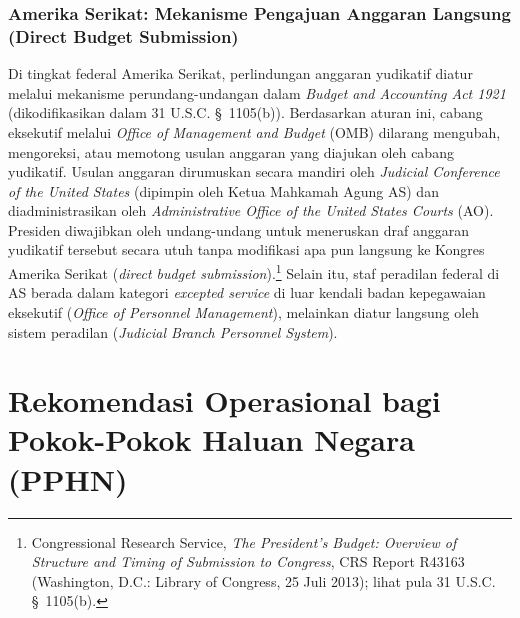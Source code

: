 \documentclass[12pt,a4paper,twocolumn]{article}
\begin{document}
\subsubsection{Amerika Serikat: Mekanisme Pengajuan Anggaran Langsung (Direct Budget Submission)}
Di tingkat federal Amerika Serikat, perlindungan anggaran yudikatif diatur melalui mekanisme perundang-undangan dalam \textit{Budget and Accounting Act 1921} (dikodifikasikan dalam 31 U.S.C. \S\ 1105(b)). Berdasarkan aturan ini, cabang eksekutif melalui \textit{Office of Management and Budget} (OMB) dilarang mengubah, mengoreksi, atau memotong usulan anggaran yang diajukan oleh cabang yudikatif. Usulan anggaran dirumuskan secara mandiri oleh \textit{Judicial Conference of the United States} (dipimpin oleh Ketua Mahkamah Agung AS) dan diadministrasikan oleh \textit{Administrative Office of the United States Courts} (AO). Presiden diwajibkan oleh undang-undang untuk meneruskan draf anggaran yudikatif tersebut secara utuh tanpa modifikasi apa pun langsung ke Kongres Amerika Serikat (\textit{direct budget submission}).\footnote{Congressional Research Service, \textit{The President's Budget: Overview of Structure and Timing of Submission to Congress}, CRS Report R43163 (Washington, D.C.: Library of Congress, 25 Juli 2013); lihat pula 31 U.S.C. \S\ 1105(b).} Selain itu, staf peradilan federal di AS berada dalam kategori \textit{excepted service} di luar kendali badan kepegawaian eksekutif (\textit{Office of Personnel Management}), melainkan diatur langsung oleh sistem peradilan (\textit{Judicial Branch Personnel System}).

\section{Rekomendasi Operasional bagi Pokok-Pokok Haluan Negara (PPHN)}
\end{document}
